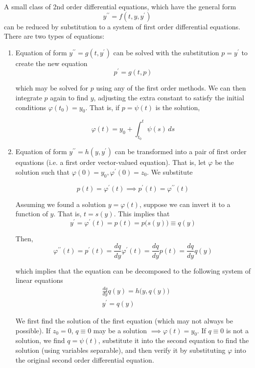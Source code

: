 \documentclass{article}
\theoremstyle{remark}
\theoremstyle{definition}
\begin{document}
    A small class of 2nd order differential equations, which have the general form 
    \[y^{\prime \prime} = f(t, y, y^\prime)\]
    can be reduced by substitution to a system of first order differential equations. There are two types of equations: 
    \begin{enumerate}
      \item Equation of form $y^{\prime \prime} = g(t, y^\prime)$ can be solved with the substitution $p = y^\prime$ to create the new equation 
      \[p^\prime = g(t, p)\]

      which may be solved for $p$ using any of the first order methods. We can then integrate $p$ again to find $y$, adjusting the extra constant to satisfy the initial conditions $\varphi(t_0) = y_0$. That is, if $p = \psi(t)$ is the solution, 

        \[\varphi (t) = y_0 + \int_{t_0}^t \psi (s) \,ds\]

      \item Equation of form $y^{\prime \prime} = h(y, y^\prime)$ can be transformed into a pair of first order equations (i.e. a first order vector-valued equation). That is, let $\varphi$ be the solution such that $\varphi(0) = y_0, \varphi^\prime(0) = z_0$. We substitute 

        \[p(t) = \varphi^\prime (t) \implies p^\prime (t) = \varphi^{\prime \prime} (t)\]

      Assuming we found a solution $y = \varphi(t)$, suppose we can invert it to a function of $y$. That is, $t = s(y)$. This implies that
        \[y^\prime = \varphi^\prime (t) = p(t) = p\big( s(y) \big) \equiv q(y)\]

      Then,
        \[\varphi^{\prime \prime} (t) = p^\prime (t) = \frac{d q}{d y} \varphi^\prime (t) = \frac{d q}{d y} p(t) = \frac{d q}{d y} q(y)\]

      which implies that the equation can be decomposed to the following system of linear equations
        \begin{align*}
          & \frac{d q}{d y} q (y) = h\big(y, q(y)\big) \\
          & y^\prime = q(y)
        \end{align*}

      We first find the solution of the first equation (which may not always be possible). If $z_0 = 0$, $q \equiv 0$ may be a solution $\implies \varphi(t) = y_0$. If $q \equiv 0$ is not a solution, we find $q = \psi (t)$, substitute it into the second equation to find the solution (using variables separable), and then verify it by substituting $\varphi$ into the original second order differential equation. 
    \end{enumerate}
\end{document}
